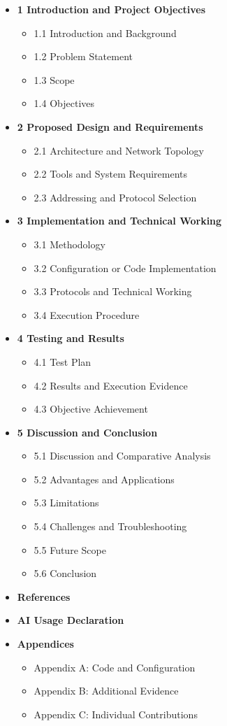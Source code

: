 \documentclass[
]{article}
\providecommand{\tightlist}{%
  \setlength{\itemsep}{0pt}\setlength{\parskip}{0pt}}
\begin{document}
\begin{itemize}
\tightlist
\item \textbf{1 Introduction and Project Objectives}
  \begin{itemize}
  \item 1.1 Introduction and Background
  \item 1.2 Problem Statement
  \item 1.3 Scope
  \item 1.4 Objectives
  \end{itemize}
\item \textbf{2 Proposed Design and Requirements}
  \begin{itemize}
  \item 2.1 Architecture and Network Topology
  \item 2.2 Tools and System Requirements
  \item 2.3 Addressing and Protocol Selection
  \end{itemize}
\item \textbf{3 Implementation and Technical Working}
  \begin{itemize}
  \item 3.1 Methodology
  \item 3.2 Configuration or Code Implementation
  \item 3.3 Protocols and Technical Working
  \item 3.4 Execution Procedure
  \end{itemize}
\item \textbf{4 Testing and Results}
  \begin{itemize}
  \item 4.1 Test Plan
  \item 4.2 Results and Execution Evidence
  \item 4.3 Objective Achievement
  \end{itemize}
\item \textbf{5 Discussion and Conclusion}
  \begin{itemize}
  \item 5.1 Discussion and Comparative Analysis
  \item 5.2 Advantages and Applications
  \item 5.3 Limitations
  \item 5.4 Challenges and Troubleshooting
  \item 5.5 Future Scope
  \item 5.6 Conclusion
  \end{itemize}
\item \textbf{References}
\item \textbf{AI Usage Declaration}
\item \textbf{Appendices}
  \begin{itemize}
  \item Appendix A: Code and Configuration
  \item Appendix B: Additional Evidence
  \item Appendix C: Individual Contributions
  \end{itemize}
\end{itemize}
\end{document}
